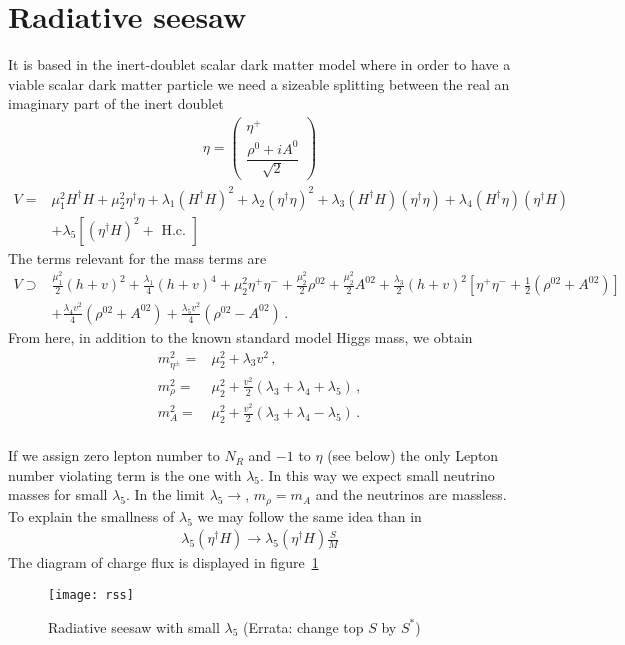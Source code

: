 \section{Radiative seesaw}
It is based in the inert-doublet scalar dark matter model where in order to have a viable scalar dark matter particle we need a sizeable splitting between the real an imaginary part of the inert doublet
\begin{align}
  \eta=\begin{pmatrix}
    \eta^+\\
    \dfrac{\rho^0+i A^0}{\sqrt{2}}
  \end{pmatrix}
\end{align}
\begin{align}
  V=& \mu_{1}^{2} H^{\dagger} H+\mu_{2}^{2} \eta^{\dagger} \eta+\lambda_{1}\left(H^{\dagger} H\right)^{2}+ \lambda_{2}\left(\eta^{\dagger} \eta\right)^{2} +\lambda_{3}\left(H^{\dagger} H\right)\left(\eta^{\dagger} \eta\right)+\lambda_{4}\left(H^{\dagger} \eta\right)\left(\eta^{\dagger} H\right) \nonumber\\
& + \lambda_{5}\left[\left(\eta^{\dagger} H\right)^{2}+\text { H.c. }\right]
\end{align}
The terms relevant for the mass terms are
\begin{align}
  V\supset& \frac{\mu_1^2}{2} \left( h+v\right)^2+\frac{\lambda_1}{4} \left( h+v \right)^4
  +\mu_2^2 \eta^+\eta^- +\frac{\mu_2^2}{2} \rho^{02} +\frac{\mu_2^2}{2} A^{02}
  +\frac{\lambda_3}{2} \left( h+v \right)^2 \left[ \eta^+\eta^- + \frac{1}{2}\left( \rho^{02}+A^{02} \right) \right] \nonumber\\
 &+ \frac{\lambda_4 v^2}{4} \left( \rho^{02}+A^{02} \right) + \frac{\lambda_5 v^2}{4} \left( \rho^{02}-A^{02} \right)\,.
\end{align}
From here, in addition to the known standard model Higgs mass, we obtain
\begin{align}
  m_{\eta^{\pm}}^2=&\mu_2^2+{\lambda_3 v^2}\,,  \nonumber\\ %
  m_{\rho}^2=&\mu_2^2+\frac{v^2}{2} \left(\lambda_3+\lambda_4+\lambda_5  \right)\,, \nonumber\\
  m_{A}^2=&\mu_2^2+\frac{v^2}{2} \left(\lambda_3+\lambda_4-\lambda_5  \right)\,. \nonumber\\
\end{align}

If we assign zero lepton number to $N_R$ and $-1$ to $\eta$ (see below) the only Lepton number violating term is the one with $\lambda_5$. In this way we expect small neutrino masses for small $\lambda_5$. In the limit $\lambda_5\to $, $m_{\rho}=m_A$ and the neutrinos are massless.
To explain the smallness of $\lambda_5$ we may follow the same idea than in~\cite{Suematsu:2017kcu}
\begin{align}
  \lambda_5 \left( \eta^{\dagger}H \right) \to    \lambda_5 \left( \eta^{\dagger}H \right) \frac{S}{M}
\end{align}
The diagram of charge flux is displayed in figure~\ref{fig:rss}
\begin{figure}
  \centering
  \texttt{[image: rss]}
  \caption{Radiative seesaw with small $\lambda_5$ (Errata: change top $S$ by $S^{*}$)}
  \label{fig:rss}
\end{figure}

